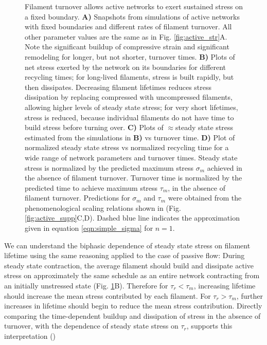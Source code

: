 \documentclass[10pt,letterpaper]{article}
\begin{document}
\begin{figure}[h!]
	\centering
	\caption{\label{fig:active_rec} Filament turnover allows active networks to exert sustained stress on a fixed boundary. \textbf{A)} Snapshots from simulations of active networks with fixed boundaries and different rates of filament turnover.  All other parameter values are the same as in Fig. \ref{fig:active_str}A. Note the significant buildup of compressive strain and significant remodeling for longer, but not shorter, turnover times. \textbf{B)} Plots of net stress exerted by the network on its boundaries for different recycling times; for long-lived filaments, stress is built rapidly, but then dissipates. Decreasing filament lifetimes reduces stress dissipation by replacing compressed with uncompressed filaments, allowing higher levels of steady state stress; for very short lifetimes, stress is reduced, because individual filaments do not have time to build stress before turning over. \textbf{C)} Plots of $\approx$steady state stress estimated from the simulations in \textbf{B)} vs turnover time.  \textbf{D)} Plot of normalized steady state stress vs normalized recycling time for a wide range of network parameters and turnover times.  Steady state stress is normalized by the predicted maximum stress $\sigma_{m}$ achieved in the absence of filament turnover.  Turnover time is normalized by the predicted time to achieve maximum stress $\tau_{m}$, in the absence of filament turnover.  Predictions for $\sigma_{m}$ and $\tau_{m}$  were obtained from the phenomenological scaling relations shown in (Fig. \ref{fig:active_supp}C,D). Dashed blue line indicates the approximation given in equation \ref{eqn:simple_sigma} for $n=1$.}
\end{figure}

We can understand the biphasic dependence of steady state stress on filament lifetime using the same reasoning applied to the case of passive flow:   During steady state contraction, the average filament should build and dissipate active stress on approximately the same schedule as an entire network contracting from an initially unstressed state (Fig. \ref{fig:active_rec}B). Therefore for $\tau_r < \tau_m$, increasing lifetime should increase the mean stress contributed by each filament. For $\tau_r > \tau_m$, further increases in lifetime should begin to reduce the mean stress contribution. Directly comparing the time-dependent buildup and dissipation of stress in the absence of turnover, with the dependence of steady state stress on $\tau_r$, supports this interpretation ()  
\end{document}

